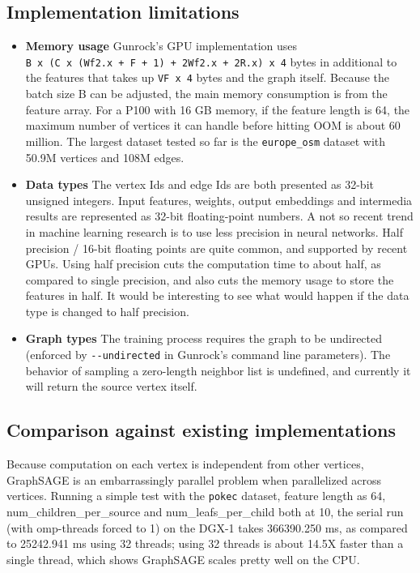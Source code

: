\documentclass[10pt,oneside]{memoir}
\begin{document}
\hypertarget{implementation-limitations-2}{%
\subsection{Implementation
limitations}\label{implementation-limitations-2}}

\begin{itemize}
\item
  \textbf{Memory usage} Gunrock's GPU implementation uses
  \texttt{B\ x\ (C\ x\ (Wf2.x\ +\ F\ +\ 1)\ +\ 2Wf2.x\ +\ 2R.x)\ x\ 4}
  bytes in additional to the features that takes up \texttt{VF\ x\ 4}
  bytes and the graph itself. Because the batch size B can be adjusted,
  the main memory consumption is from the feature array. For a P100 with
  16 GB memory, if the feature length is 64, the maximum number of
  vertices it can handle before hitting OOM is about 60 million. The
  largest dataset tested so far is the \texttt{europe\_osm} dataset with
  50.9M vertices and 108M edges.
\item
  \textbf{Data types} The vertex Ids and edge Ids are both presented as
  32-bit unsigned integers. Input features, weights, output embeddings
  and intermedia results are represented as 32-bit floating-point
  numbers. A not so recent trend in machine learning research is to use
  less precision in neural networks. Half precision / 16-bit floating
  points are quite common, and supported by recent GPUs. Using half
  precision cuts the computation time to about half, as compared to
  single precision, and also cuts the memory usage to store the features
  in half. It would be interesting to see what would happen if the data
  type is changed to half precision.
\item
  \textbf{Graph types} The training process requires the graph to be
  undirected (enforced by \texttt{-\/-undirected} in Gunrock's command
  line parameters). The behavior of sampling a zero-length neighbor list
  is undefined, and currently it will return the source vertex itself.
\end{itemize}

\hypertarget{comparison-against-existing-implementations-2}{%
\subsection{Comparison against existing
implementations}\label{comparison-against-existing-implementations-2}}

Because computation on each vertex is independent from other vertices,
GraphSAGE is an embarrassingly parallel problem when parallelized across
vertices. Running a simple test with the \texttt{pokec} dataset, feature
length as 64, num\_children\_per\_source and num\_leafs\_per\_child both
at 10, the serial run (with omp-threads forced to 1) on the DGX-1 takes
366390.250 ms, as compared to 25242.941 ms using 32 threads; using 32
threads is about 14.5X faster than a single thread, which shows
GraphSAGE scales pretty well on the CPU.
\end{document}
